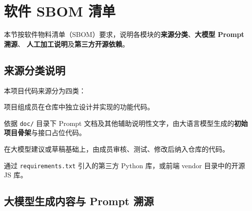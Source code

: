 \section{软件 SBOM 清单}

本节按软件物料清单（SBOM）要求，说明各模块的\textbf{来源分类}、\textbf{大模型 Prompt 溯源}、
\textbf{人工加工说明}及\textbf{第三方开源依赖}。

\subsection{来源分类说明}

本项目代码来源分为四类：

\begin{description}[leftmargin=4em,style=nextline]
    \item[自研]
    项目组成员在仓库中独立设计并实现的功能代码。

    \item[大模型生成]
    依据 \texttt{doc/} 目录下 Prompt 文档及其他辅助说明性文字，由大语言模型生成的\textbf{初始项目骨架}与接口占位代码。

    \item[大模型辅助生成]
    在大模型建议或草稿基础上，由成员审核、测试、修改后纳入仓库的代码。

    \item[复用开源]
    通过 \texttt{requirements.txt} 引入的第三方 Python 库，或前端 vendor 目录中的开源 JS 库。
\end{description}

\subsection{大模型生成内容与 Prompt 溯源}

